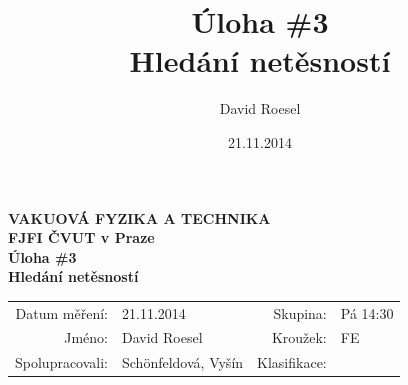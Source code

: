 \documentclass[english]{article}
\newcommand{\Author}{David Roesel}
\newcommand{\Coauthor}{Schönfeldová, Vyšín}
\newcommand{\Institute}{FJFI ČVUT v Praze}
\newcommand{\Subject}{VAKUOVÁ FYZIKA A TECHNIKA}
\newcommand{\Group}{Pá 14:30}
\newcommand{\Kruh}{FE}
\newcommand{\Title}{Úloha \#3  \\Hledání netěsností}
\newcommand{\Date}{21.11.2014}
\begin{document}
\author{\Author}
\title{\Title}
\date{\Date}

\renewcommand{\figurename}{Obr.}
\renewcommand{\tablename}{Tab.}
\renewcommand{\refname}{Reference}


\setlength{\parindent}{0cm}
\begin{multicols}{2}
\textbf{\Subject \\
        \Institute \\[0.1cm]
\Title \\[0.5cm]
}
\begin{tabular}{rlrl}
\large Datum měření: & \Date & \large Skupina: & \Group \\
\large Jméno: & \Author & \large Kroužek:  & \Kruh\\
\large Spolupracovali: & \Coauthor &\large Klasifikace:\\
\end{tabular}


\end{multicols}
\end{document}
